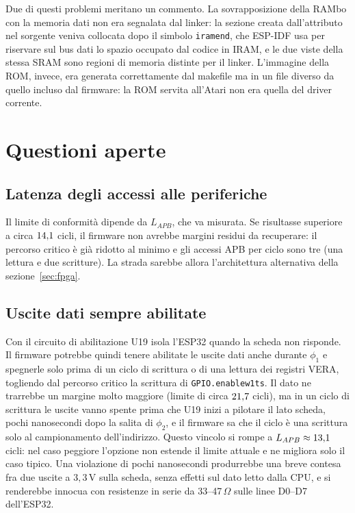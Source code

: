 \documentclass[11pt,a4paper,twoside,openright]{report}
\DeclareRobustCommand{\code}[1]{\begingroup\renewcommand{\_}{\textunderscore\allowbreak}\texttt{#1}\endgroup}
\begin{document}
Due di questi problemi meritano un commento. La sovrapposizione della RAMbo con la memoria
dati non era segnalata dal linker: la sezione creata dall'attributo nel sorgente veniva
collocata dopo il simbolo \code{\_iram\_end}, che ESP-IDF usa per riservare sul bus dati lo
spazio occupato dal codice in IRAM, e le due viste della stessa SRAM sono regioni di memoria
distinte per il linker. L'immagine della ROM, invece, era generata correttamente dal
makefile ma in un file diverso da quello incluso dal firmware: la ROM servita all'Atari non
era quella del driver corrente.

\chapter{Questioni aperte}
\label{cap:aperte}

\section{Latenza degli accessi alle periferiche}

Il limite di conformità dipende da $L_{APB}$, che va misurata. Se risultasse superiore a
circa $14{,}1$ cicli, il firmware non avrebbe margini residui da recuperare: il percorso
critico è già ridotto al minimo e gli accessi APB per ciclo sono tre (una lettura e due
scritture). La strada sarebbe allora l'architettura alternativa della
sezione~\ref{sec:fpga}.

\section{Uscite dati sempre abilitate}

Con il circuito di abilitazione U19 isola l'ESP32 quando la scheda non risponde. Il firmware
potrebbe quindi tenere abilitate le uscite dati anche durante $\phi_1$ e spegnerle solo
prima di un ciclo di scrittura o di una lettura dei registri VERA, togliendo dal percorso
critico la scrittura di \code{GPIO.enable\_w1ts}. Il dato ne trarrebbe un margine molto
maggiore (limite di circa $21{,}7$ cicli), ma in un ciclo di scrittura le uscite
vanno spente prima che U19 inizi a pilotare il lato scheda, pochi nanosecondi dopo la salita
di $\phi_2$, e il firmware sa che il ciclo è una scrittura solo al campionamento
dell'indirizzo. Questo vincolo si rompe a $L_{APB} \approx 13{,}1$ cicli: nel caso
peggiore l'opzione non estende il limite attuale e ne migliora solo il caso tipico. Una
violazione di pochi nanosecondi produrrebbe una breve contesa fra due uscite a
$3{,}3\,\mathrm{V}$ sulla scheda, senza effetti sul dato letto dalla CPU, e si renderebbe
innocua con resistenze in serie da 33--47\,$\Omega$ sulle linee D0--D7 dell'ESP32.
\end{document}
